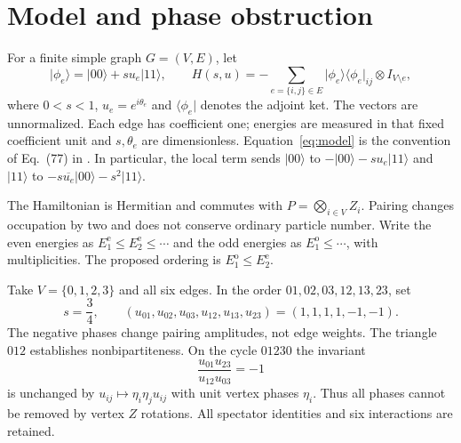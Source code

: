 \documentclass[11pt]{article}
\newcommand{\ket}[1]{\lvert #1\rangle}
\newcommand{\bra}[1]{\langle #1\rvert}
\newcommand{\Ee}{E^{\mathrm e}}
\newcommand{\Eo}{E^{\mathrm o}}
\begin{document}
\section{Model and phase obstruction}
For a finite simple graph $G=(V,E)$, let
\begin{equation}
 \ket{\phi_e}=\ket{00}+s u_e\ket{11},\qquad
 H(s,u)=-\sum_{e=\{i,j\}\in E}\ket{\phi_e}\!\bra{\phi_e}_{ij}\otimes I_{V\setminus e},
 \label{eq:model}
\end{equation}
where $0<s<1$, $u_e=e^{i\theta_e}$ and $\bra{\phi_e}$ denotes the adjoint ket. The vectors are unnormalized. Each edge has coefficient one; energies are measured in that fixed coefficient unit and $s,\theta_e$ are dimensionless. Equation~\eqref{eq:model} is the convention of Eq.~(77) in \cite{Wong2026}. In particular, the local term sends $\ket{00}$ to $-\ket{00}-su_e\ket{11}$ and $\ket{11}$ to $-s\overline{u_e}\ket{00}-s^2\ket{11}$.

The Hamiltonian is Hermitian and commutes with $P=\bigotimes_{i\in V}Z_i$. Pairing changes occupation by two and does not conserve ordinary particle number. Write the even energies as $\Ee_1\le\Ee_2\le\cdots$ and the odd energies as $\Eo_1\le\cdots$, with multiplicities. The proposed ordering is $\Eo_1\le\Ee_2$.

Take $V=\{0,1,2,3\}$ and all six edges. In the order $01,02,03,12,13,23$, set
\begin{equation}
 s=\frac34,\qquad (u_{01},u_{02},u_{03},u_{12},u_{13},u_{23})=(1,1,1,1,-1,-1).
 \label{eq:witness}
\end{equation}
The negative phases change pairing amplitudes, not edge weights. The triangle $012$ establishes nonbipartiteness. On the cycle $01230$ the invariant
\begin{equation}
 \frac{u_{01}u_{23}}{u_{12}u_{03}}=-1
 \label{eq:cycle}
\end{equation}
is unchanged by $u_{ij}\mapsto\eta_i\eta_j u_{ij}$ with unit vertex phases $\eta_i$. Thus all phases cannot be removed by vertex $Z$ rotations. All spectator identities and six interactions are retained.
\end{document}
